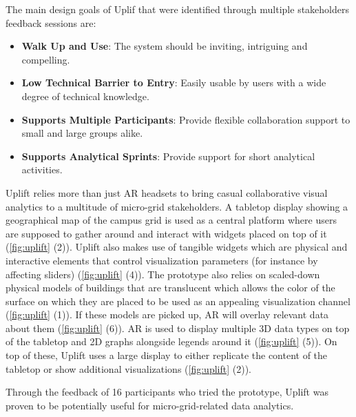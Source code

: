 \documentclass{vgtc}                          %
\begin{document}
\medskip

\noindent The main design goals of Uplif that were identified through multiple
stakeholders feedback sessions are:
\begin{itemize}
	\item \textbf{Walk Up and Use}: The system should be inviting, intriguing and
	      compelling.
	\item \textbf{Low Technical Barrier to Entry}: Easily usable by users with a wide
	      degree of technical knowledge.
	\item \textbf{Supports Multiple Participants}: Provide flexible collaboration
	      support to small and large groups alike.
	\item \textbf{Supports Analytical Sprints}: Provide support for short analytical
	      activities.
\end{itemize}

\medskip

\noindent Uplift relies more than just AR headsets to bring casual
collaborative visual analytics to a multitude of micro-grid stakeholders.
A tabletop display showing a geographical map of the campus grid is used as a
central platform where users are supposed to gather around and interact with
widgets placed on top of it (\autoref{fig:uplift} (2)). Uplift also makes use of
tangible widgets which are physical and interactive elements that control
visualization parameters (for instance by affecting sliders) (\autoref{fig:uplift}
(4)). The prototype also relies on scaled-down physical models of buildings
that are translucent which allows the color of the surface on which they are
placed to be used as an appealing visualization channel
(\autoref{fig:uplift} (1)). If these models are picked up, AR will overlay
relevant data about them (\autoref{fig:uplift} (6)). AR is used to display
multiple 3D data types on top of the tabletop and 2D graphs alongside legends
around it (\autoref{fig:uplift} (5)). On top of these, Uplift uses a large display
to either replicate the content of the tabletop or show additional
visualizations (\autoref{fig:uplift} (2)).

\medskip

\noindent Through the feedback of 16 participants who tried the prototype,
Uplift was proven to be potentially useful for micro-grid-related data
analytics.

\medskip
\end{document}
